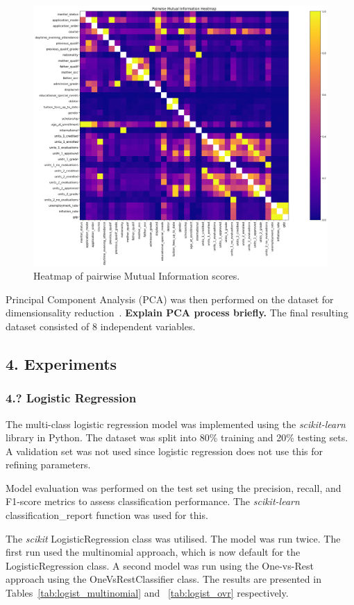 \documentclass[12pt]{article}
\begin{document}
\begin{figure} [H]
    \centering
    \includegraphics[width=0.8\linewidth]{pairwise_mi}
    \caption{Heatmap of pairwise Mutual Information scores.}\label{fig:pairwise_mi}
  \end{figure}  

Principal Component Analysis (PCA) was then performed on the dataset for dimensionsality reduction~\cite{Gewers2021}. \textbf{Explain PCA process briefly.} The final resulting dataset consisted of 8 independent variables.

\newpage
\subsection*{4. Experiments}
\subsubsection*{4.? Logistic Regression}

The multi-class logistic regression model was implemented using the \textit{scikit-learn} library in Python. The dataset was split into 80\% training and 20\% testing sets. A validation set was not used since logistic regression does not use this for refining parameters.

Model evaluation was performed on the test set using the precision, recall, and F1-score metrics to assess classification performance. The \textit{scikit-learn} classification\_report function was used for this. 

The \textit{scikit} LogisticRegression class was utilised. The model was run twice. The first run used the multinomial approach, which is now default for the LogisticRegression class. A second model was run using the One-vs-Rest approach using the OneVsRestClassifier class. The results are presented in Tables~\ref{tab:logist_multinomial} and ~\ref{tab:logist_ovr} respectively. 
\end{document}
